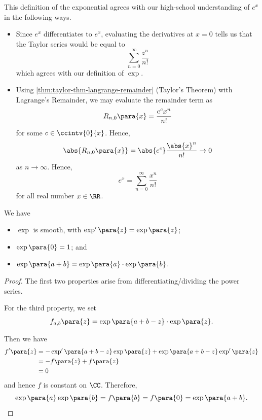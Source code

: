 \begin{remarks}
    This definition of the exponential agrees with our high-school understanding of \(e^x\) in the following ways.
    \begin{itemize}
        \item Since \(e^x\) differentiates to \(e^x\), evaluating the derivatives at \(x = 0\) tells us that the Taylor series would be equal to
        \[
            \sum_{n = 0}^{\infty} \frac{z^n}{n!}
        \]
        which agrees with our definition of \(\exp\).

        \item Using \autoref{thm:taylor-thm-langrange-remainder} (Taylor's Theorem) with Lagrange's Remainder, we may evaluate the remainder term as
        \[
            R_{n, 0} \para{x} = \frac{e^c x^n}{n!}
        \]
        for some \(c \in \ccintv{0}{x}\). Hence,
        \[
            \abs{R_{n, 0} \para{x}} = \abs{e^c} \frac{\abs{x}^n}{n!} \to 0
        \]
        as \(n \to \infty\). Hence,
        \[
            e^x = \sum_{n = 0}^{\infty} \frac{x^n}{n!}
        \]
        for all real number \(x \in \RR\).
    \end{itemize}
\end{remarks}

\begin{lemma}
    \label{lem:properties-exp}%
    We have
    \begin{itemize}
        \item \(\exp\) is smooth, with \(\exp'\para{z} = \exp\para{z}\);
        \item \(\exp\para{0} = 1\); and
        \item \(\exp\para{a + b} = \exp\para{a} \cdot \exp\para{b}\).
    \end{itemize}
\end{lemma}

\begin{proof}
    The first two properties arise from differentiating/dividing the power series.

    For the third property, we set
    \[
        f_{a, b} \para{z} = \exp\para{a + b - z} \cdot \exp\para{z}.
    \]

    Then we have
    \begin{align*}
        f'\para{z} &= - \exp'\para{a + b - z} \exp\para{z} + \exp\para{a + b - z} \exp'\para{z} \\
        &= - f\para{z} + f\para{z} \\
        &= 0
    \end{align*}
    and hence \(f\) is constant on \(\CC\). Therefore,
    \[
        \exp\para{a} \exp\para{b} = f\para{b} = f\para{0} = \exp\para{a + b}.
    \]
\end{proof}

